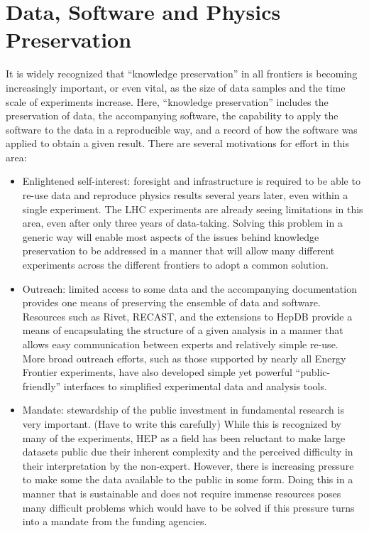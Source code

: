 \section{Data, Software and Physics Preservation}
It is widely recognized that “knowledge preservation” in all frontiers is becoming 
increasingly important, or even vital, as the size of data samples and the time 
scale of experiments increase.  Here, ``knowledge preservation'' includes the preservation 
of data, the accompanying software, the capability to apply the software to the data 
in a reproducible way, and a record of how the software was applied to obtain a given 
result.  There are several motivations for effort in this area:
\begin{itemize}
\item
Enlightened self-interest: foresight and infrastructure is required to be able to 
re-use data and reproduce physics results several years later, even within a single 
experiment.  The LHC experiments are already seeing limitations in this area, even 
after only three years of data-taking.  Solving this problem in a generic way will 
enable most aspects of the issues behind knowledge preservation to be addressed in 
a manner that will allow many different experiments across the different frontiers 
to adopt a common solution.
\item
Outreach: limited access to some data and the accompanying documentation provides one 
means of preserving the ensemble of data and software.  Resources such as Rivet, 
RECAST, and the extensions to HepDB provide a means of encapsulating the structure 
of a given analysis in a manner that allows easy communication between experts and 
relatively simple re-use.  More broad outreach efforts, such as those supported by 
nearly all Energy Frontier experiments, have also developed simple yet powerful 
``public-friendly'' interfaces to simplified experimental data and analysis tools.
\item
Mandate: stewardship of the public investment in fundamental research is very important. 
(Have to write this carefully) While this is recognized by many of the experiments, 
HEP as a field has been reluctant to make large datasets public due their inherent 
complexity and the perceived difficulty in their interpretation by the non-expert.  
However, there is increasing pressure to make some the data available to the public 
in some form.  Doing this in a manner that is sustainable and does not require immense 
resources poses many difficult problems which would have to be solved if this pressure 
turns into a mandate from the funding agencies.
\end{itemize}

